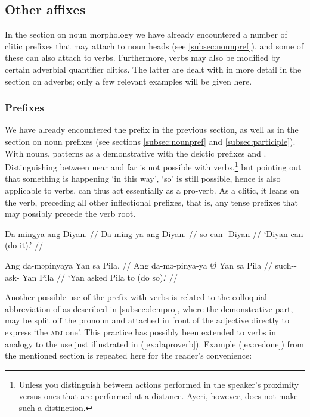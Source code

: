 
\subsection{Other affixes}

In the section on noun morphology we have already encountered a number of 
clitic prefixes that may attach to noun heads (see \autoref{subsec:nounpref}), 
and some of these can also attach to verbs. Furthermore, verbs may also be 
modified by certain adverbial quantifier clitics. The latter are dealt with in 
more detail in the section on adverbs; only a few relevant examples will be 
given here.

\subsubsection{Prefixes}
\label{subsubsec:verbprefixes}

We have already encountered the prefix  in the previous
section, as well as in the section on noun prefixes (see sections
\ref{subsec:nounpref} and \ref{subsec:participle}). With nouns,
 patterns as a demonstrative with the deictic prefixes
 and . Distinguishing between near
and far is not possible with verbs,\footnote{Unless you distinguish between
actions performed in the speaker's proximity versus ones that are performed at
a distance. Ayeri, however, does not make such a distinction.} but pointing out
that something is happening `in this way', `so' is still possible, hence
 is also applicable to verbs.  can thus act
essentially as a pro-verb. As a clitic, it leans on the verb, preceding all
other inflectional prefixes, that is, any tense prefixes that may possibly
precede the verb root.

\pex\label{ex:daproverb}
\a\begingl
	\gla Da-mingya ang Diyan. //
	\glb Da-ming-ya ang Diyan. //
	\glc so-can-\TsgM{} \Aarg{} Diyan //
	\glft `Diyan can (do it).' //
\endgl

\a\begingl
	\gla Ang da-məpinyaya {} Yan sa Pila. //
	\glb Ang da-mə-pinya-ya Ø Yan sa Pila //
	\glc \AgtT{} such-\Pst{}-ask-\TsgM{} \Top{} Yan \Parg{} Pila //
	\glft `Yan asked Pila to (do so).' //
\endgl

\xe

Another possible use of the prefix  with verbs is related to the 
colloquial abbreviation of  as described in 
\autoref{subsec:dempro}, where the demonstrative part,  may be 
split off the pronoun and attached in front of the adjective directly to 
express `the \textsc{adj} one'. This practice has possibly been extended to 
verbs in analogy to the use just illustrated in (\ref{ex:daproverb}). Example 
(\ref{ex:redone}) from the mentioned section is repeated here for the reader's 
convenience:

